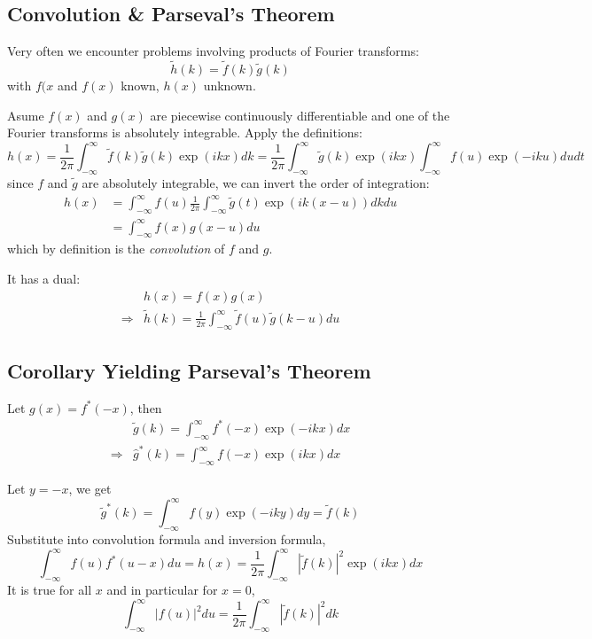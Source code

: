 \documentclass[a4paper]{article}
\newcommand*{\ft}{\tilde}
\begin{document}
\subsection{Convolution \& Parseval's Theorem}

Very often we encounter problems involving products of Fourier transforms:
\[
  \ft h(k) = \ft f(k) \ft g(k)
\]
with \(f(x\) and \(f(x)\) known, \(h(x)\) unknown.

Asume \(f(x)\) and \(g(x)\) are piecewise continuously differentiable and one of the Fourier transforms is absolutely integrable. Apply the definitions:
\[
  h(x) = \frac{1}{2\pi} \int_{-\infty}^{\infty} \ft f(k) \ft g(k) \exp(ikx) dk = \frac{1}{2\pi} \int_{-\infty}^{\infty} \ft g(k) \exp(ikx) \int_{-\infty}^{\infty} f(u) \exp(-iku) du dt
\]
since \(f\) and \(\ft g\) are absolutely integrable, we can invert the order of integration:
\begin{align*}
  h(x) &= \int_{-\infty}^{\infty} f(u) \frac{1}{2\pi} \int_{-\infty}^{\infty} \ft g(t) \exp(ik(x - u)) dk du \\
       &= \int_{-\infty}^{\infty} f(x)g(x - u) du
\end{align*}
which by definition is the \emph{convolution} of \(f\) and \(g\).

\begin{ex}
  It has a dual:
  \begin{align*}
    & h(x) = f(x)g(x) \\
    \Rightarrow & \ft h(k) = \frac{1}{2\pi} \int_{-\infty}^{\infty} \ft f(u) \ft g(k - u) du
  \end{align*}
\end{ex}

\subsection{Corollary Yielding Parseval's Theorem}

Let \(g(x) = f^*(-x)\), then
\begin{align*}
  & \ft g(k) = \int_{-\infty}^{\infty} f^*(-x) \exp(-ikx) dx \\
  \Rightarrow & \hat g^*(k) = \int_{-\infty}^{\infty} f(-x) \exp(ikx) dx
\end{align*}

Let \(y = -x\), we get
\[
  \ft g^*(k) = \int_{-\infty}^{\infty} f(y) \exp(-iky) dy = \ft f(k)
\]
Substitute into convolution formula and inversion formula,
\[
  \int_{-\infty}^{\infty} f(u) f^*(u - x) du = h(x) = \frac{1}{2\pi} \int_{-\infty}^{\infty} |\ft f(k)|^2 \exp(ikx) dx
\]
It is true for all \(x\) and in particular for \(x = 0\),
\[
  \int_{-\infty}^{\infty} |f(u)|^2 du = \frac{1}{2\pi} \int_{-\infty}^{\infty} |\ft f(k)|^2 dk
\]
\end{document}
